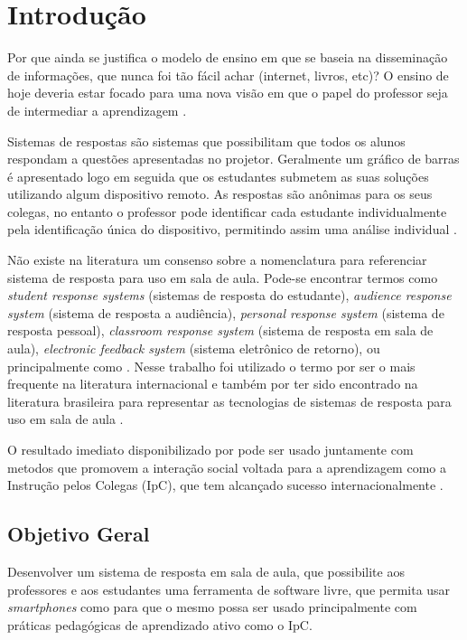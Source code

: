 \chapter{Introdução}

Por que ainda se justifica o modelo de ensino em que se baseia
na disseminação de informações, que nunca foi tão fácil achar (internet,
livros, etc)? O ensino de hoje deveria estar focado para uma nova
visão em que o papel do professor seja de intermediar a aprendizagem \cite{Araujo2013}.

Sistemas de respostas são sistemas que possibilitam que todos os alunos
respondam a questões apresentadas no projetor. Geralmente um gráfico de barras
é apresentado logo em seguida que os estudantes submetem as suas soluções
utilizando algum dispositivo remoto. As respostas são anônimas para os seus colegas,
no entanto o professor pode identificar cada estudante individualmente pela
identificação única do dispositivo, permitindo assim uma análise individual \cite{Kay2009}.

Não existe na literatura um consenso sobre a nomenclatura para referenciar sistema de
resposta para uso em sala de aula. Pode-se encontrar termos como
{\textit{student response systems}} (sistemas de resposta do estudante),
{\textit{audience response system}} (sistema de resposta a audiência),
{\textit{personal response system}} (sistema de resposta pessoal),
{\textit{classroom response system}} (sistema de resposta em sala de aula),
{\textit{electronic feedback system}} (sistema eletrônico de retorno),
ou principalmente como {\clickers} \cite{Hunsu2016}.
Nesse trabalho foi utilizado o termo {\clickers} por ser o mais frequente na literatura internacional
e também por ter sido encontrado na literatura brasileira para representar as tecnologias de sistemas
de resposta para uso em sala de aula \cite{Mattos2015, Araujo2013}.

O resultado imediato disponibilizado por {\clickers} pode ser usado juntamente
com metodos que promovem a interação social voltada para a aprendizagem como a
Instrução pelos Colegas (IpC), que tem alcançado sucesso internacionalmente \cite{Araujo2013}.

\section{Objetivo Geral}
Desenvolver um sistema de resposta em sala de aula,
que possibilite aos professores e aos estudantes uma ferramenta de software livre,
que permita usar {\textit{smartphones}} como {\clickers} para que o mesmo possa
ser usado principalmente com práticas pedagógicas de aprendizado ativo como o IpC.

